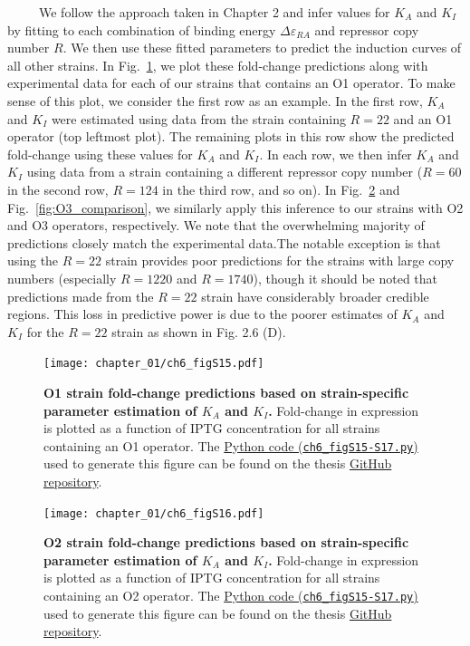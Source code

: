 \documentclass[12pt]{caltech_thesis}
\begin{document}
~~~~~We follow the approach taken in Chapter 2 and infer values for
\(K_A\) and \(K_I\) by fitting to each combination of binding energy
\(\Delta \varepsilon_{RA}\) and repressor copy number \(R\). We then use
these fitted parameters to predict the induction curves of all other
strains. In Fig.~\ref{fig:O1_comparison}, we plot these fold-change
predictions along with experimental data for each of our strains that
contains an O1 operator. To make sense of this plot, we consider the
first row as an example. In the first row, \(K_A\) and \(K_I\) were
estimated using data from the strain containing \(R=22\) and an O1
operator (top leftmost plot). The remaining plots in this row show the
predicted fold-change using these values for \(K_A\) and \(K_I\). In
each row, we then infer \(K_A\) and \(K_I\) using data from a strain
containing a different repressor copy number (\(R=60\) in the second
row, \(R=124\) in the third row, and so on). In
Fig.~\ref{fig:O2_comparison} and Fig.~\ref{fig:O3_comparison}, we
similarly apply this inference to our strains with O2 and O3 operators,
respectively. We note that the overwhelming majority of predictions
closely match the experimental data.The notable exception is that using
the \(R=22\) strain provides poor predictions for the strains with large
copy numbers (especially \(R=1220\) and \(R=1740\)), though it should be
noted that predictions made from the \(R=22\) strain have considerably
broader credible regions. This loss in predictive power is due to the
poorer estimates of \(K_A\) and \(K_I\) for the \(R=22\) strain as shown
in Fig. 2.6 (D).

\hypertarget{fig:O1_comparison}{%
\begin{figure}
\centering
\texttt{[image: chapter\_01/ch6\_figS15.pdf]}
\caption[{O1 strain fold-change predictions based on strain-specific
parameter estimation of \(K_A\) and \(K_I\).}]{\textbf{O1 strain
fold-change predictions based on strain-specific parameter estimation of
\(K_A\) and \(K_I\).} Fold-change in expression is plotted as a function
of IPTG concentration for all strains containing an O1 operator. The
\href{https://github.com/gchure/phd/blob/master/src/chapter_06/code/ch6_figS15-17.py}{Python
code (\texttt{ch6\_figS15-S17.py})} used to generate this figure can be
found on the thesis \href{https://github.com/gchure/phd}{GitHub
repository}.}
\label{fig:O1_comparison}
\end{figure}
}

\hypertarget{fig:O2_comparison}{%
\begin{figure}
\centering
\texttt{[image: chapter\_01/ch6\_figS16.pdf]}
\caption[{O2 strain fold-change predictions based on strain-specific
parameter estimation of \(K_A\) and \(K_I\).}]{\textbf{O2 strain
fold-change predictions based on strain-specific parameter estimation of
\(K_A\) and \(K_I\).} Fold-change in expression is plotted as a function
of IPTG concentration for all strains containing an O2 operator. The
\href{https://github.com/gchure/phd/blob/master/src/chapter_06/code/ch6_figS15-17.py}{Python
code (\texttt{ch6\_figS15-S17.py})} used to generate this figure can be
found on the thesis \href{https://github.com/gchure/phd}{GitHub
repository}.}
\label{fig:O2_comparison}
\end{figure}
}
\end{document}
